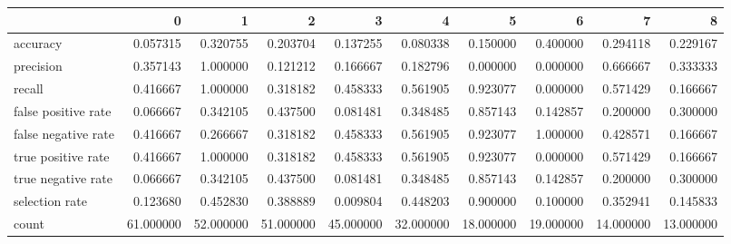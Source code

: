 \begin{tabular}{lrrrrrrrrr}
\toprule
{} &          0 &          1 &          2 &          3 &          4 &          5 &          6 &          7 &          8 \\
\midrule
accuracy            &   0.057315 &   0.320755 &   0.203704 &   0.137255 &   0.080338 &   0.150000 &   0.400000 &   0.294118 &   0.229167 \\
precision           &   0.357143 &   1.000000 &   0.121212 &   0.166667 &   0.182796 &   0.000000 &   0.000000 &   0.666667 &   0.333333 \\
recall              &   0.416667 &   1.000000 &   0.318182 &   0.458333 &   0.561905 &   0.923077 &   0.000000 &   0.571429 &   0.166667 \\
false positive rate &   0.066667 &   0.342105 &   0.437500 &   0.081481 &   0.348485 &   0.857143 &   0.142857 &   0.200000 &   0.300000 \\
false negative rate &   0.416667 &   0.266667 &   0.318182 &   0.458333 &   0.561905 &   0.923077 &   1.000000 &   0.428571 &   0.166667 \\
true positive rate  &   0.416667 &   1.000000 &   0.318182 &   0.458333 &   0.561905 &   0.923077 &   0.000000 &   0.571429 &   0.166667 \\
true negative rate  &   0.066667 &   0.342105 &   0.437500 &   0.081481 &   0.348485 &   0.857143 &   0.142857 &   0.200000 &   0.300000 \\
selection rate      &   0.123680 &   0.452830 &   0.388889 &   0.009804 &   0.448203 &   0.900000 &   0.100000 &   0.352941 &   0.145833 \\
count               &  61.000000 &  52.000000 &  51.000000 &  45.000000 &  32.000000 &  18.000000 &  19.000000 &  14.000000 &  13.000000 \\
\bottomrule
\end{tabular}
